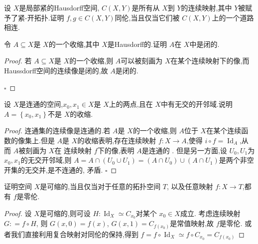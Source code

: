 \documentclass[../../几何与拓扑.tex]{subfiles}
\begin{document}
\begin{problemset}
    \item 设 \(  X  \)是局部紧的Hausdorff空间, \(  C\left( X,Y \right)   \)是所有从 \(  X  \)到 \(  Y  \)的连续映射,其中 \(  Y  \)被赋予了紧-开拓扑.证明 \(  f,g \in C\left( X,Y \right)   \)同伦,当且仅当它们被 \(  C\left( X,Y \right)   \)上的一个道路相连. 
    \item 令 \(  A\subseteq X  \)是 \(  X  \)的一个收缩,其中 \(  X  \)是Hausdorff的.证明 \(  A  \)在 \(  X  \)中是闭的.        
    \begin{proof}
    
        若 \(  A\subseteq X  \)是 \(  X  \)的一个收缩,则 \(  A  \)可以被刻画为 \(  X  \)在某个连续映射下的像,而Haussdorff空间的连续像是闭的,故 \(  A  \)是闭的.     
        

        
        \hfill $\square$
    \end{proof}
    \item   设 \(  X  \)是连通的空间,\(  x_0,x_1 \in X  \)是 \(  X  \)上的两点,且在 \(  X  \)中有无交的开邻域.说明 \(  A =  \left\{ x_0,x_1 \right\}  \)不是 \(  X  \)的收缩.
    \begin{proof}
    
        连通集的连续像是连通的.若 \(  A  \)是 \(  X  \)的一个收缩,则 \(  A  \)位于 \(  X  \)在某个连续函数的像集上.但是 \(  A  \)是 \(  X  \)的收缩表明,存在连续映射 \(  f: X \to A  \),使得 \(  i\circ f =  \operatorname{Id}_{A}  \),从而 \(  A  \)被刻画为 \(  X  \)在 连续映射 \(  f \)下的像,表明 \(  A  \)是连通的 .             
        但是另一方面,设 \(  U_0,U_1  \)为 \(  x_0,x_1  \)的无交开邻域,则 \(  A =  A\cap \left( U_0\cup U_1 \right)   = \left( A\cap U_0 \right)\cup \left( A\cap U_1 \right)  \)是两个非空开集的无交并,是不连通的, 矛盾.   
        \hfill $\square$
    \end{proof}       
    
    \item 证明空间 \(  X  \)是可缩的,当且仅当对于任意的拓扑空间 \(  T  \),  以及任意映射 \(  f: X \to T  \),都有 \(  f  \)是零伦. 
    \begin{proof}
    
        设 \(  X  \)是可缩的,则可设 \(  H: \operatorname{Id}_{X}\simeq  C_{x_0}  \)对某个 \(  x_0 \in X  \)成立.
        考虑连续映射 \( G: = f\circ H  \), 则 \(  G\left( x,0 \right)= f\left( x \right)    \), \(  G\left( x,1 \right)=  C_{f\left( x_0 \right) }  \)是常值映射,故 \(  f  \)是零伦.
        或者我们直接利用复合映射对同伦的保持,得到 \(  f =  f\circ \operatorname{Id}_{X}\simeq  f\circ C_{x_0}= C_{f\left( x_0 \right) }  \) 
        

\end{proof}
\end{problemset}
\end{document}
